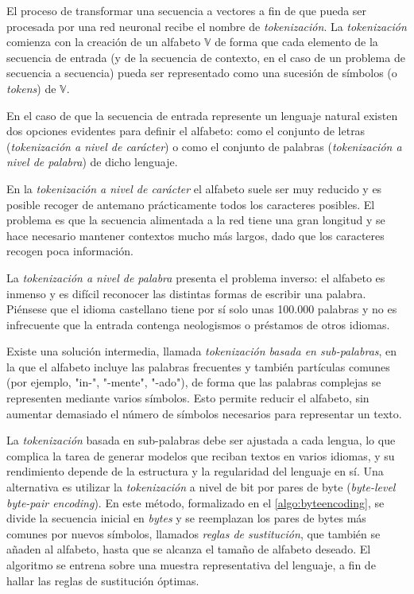 El proceso de transformar una secuencia a vectores a fin de que pueda ser procesada por una red neuronal recibe el nombre de \textit{tokenización}. La \textit{tokenización} comienza con la creación de un alfabeto \( \mathbb{V} \) de forma que cada elemento de la secuencia de entrada (y de la secuencia de contexto, en el caso de un problema de secuencia a secuencia) pueda ser representado como una sucesión de símbolos (o \textit{tokens}) de \( \mathbb{V} \).

En el caso de que la secuencia de entrada represente un lenguaje natural existen dos opciones evidentes para definir el alfabeto: como el conjunto de letras  (\textit{\textit{tokenización} a nivel de carácter}) o como el conjunto de palabras (\textit{tokenización a nivel de palabra}) de dicho lenguaje.

En la \textit{tokenización a nivel de carácter} el alfabeto suele ser muy reducido y es posible recoger de antemano prácticamente todos los caracteres posibles. El problema es que la secuencia alimentada a la red tiene una gran longitud y se hace necesario mantener contextos mucho más largos, dado que los caracteres recogen poca información.

La \textit{tokenización a nivel de palabra} presenta el problema inverso: el alfabeto es inmenso y es difícil reconocer las distintas formas de escribir una palabra. Piénsese que el idioma castellano tiene por sí solo unas 100.000 palabras y no es infrecuente que la entrada contenga neologismos o préstamos de otros idiomas.

Existe una solución intermedia, llamada \textit{tokenización basada en sub-palabras}, en la que el alfabeto incluye las palabras frecuentes y también partículas comunes (por ejemplo, "in-", "-mente", "-ado"), de forma que las palabras complejas se representen mediante varios símbolos. Esto permite reducir el alfabeto, sin aumentar demasiado el número de símbolos necesarios para representar un texto.

La \textit{tokenización} basada en sub-palabras debe ser ajustada a cada lengua, lo que complica la tarea de generar modelos que reciban textos en varios idiomas, y su rendimiento depende de la estructura y la regularidad del lenguaje en sí. Una alternativa es utilizar la \textit{tokenización} a nivel de bit por pares de byte (\textit{byte-level byte-pair encoding}). En este método, formalizado en el \cref{algo:byteencoding}, se divide la secuencia inicial en \textit{bytes} y se reemplazan los pares de bytes más comunes por nuevos símbolos, llamados \textit{reglas de sustitución}, que también se añaden al alfabeto, hasta que se alcanza el tamaño de alfabeto deseado. El algoritmo se entrena sobre una muestra representativa del lenguaje, a fin de hallar las reglas de sustitución óptimas. 

